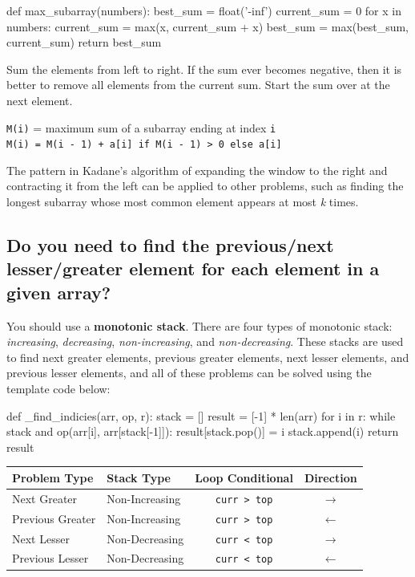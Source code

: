 \documentclass[12pt, titlepage]{article}
\begin{document}
\begin{python}
def max_subarray(numbers):
    best_sum = float('-inf')
    current_sum = 0
    for x in numbers:
        current_sum = max(x, current_sum + x)
        best_sum = max(best_sum, current_sum)
    return best_sum
\end{python}

Sum the elements from left to right. If the sum ever becomes negative,
then it is better to remove all elements from the current sum. Start the sum over at the next element.

\begin{center}
\texttt{M(i)} = maximum sum of a subarray ending at index \texttt{i} \\
\texttt{M(i) = M(i - 1) + a[i] if M(i - 1) > 0 else a[i]}
\end{center}

The pattern in Kadane's algorithm of expanding the window to the right and contracting it from the left can be applied to other problems, such as finding the longest subarray whose most common element appears at most \textit{k} times.

\subsection{Do you need to find the previous/next lesser/greater element for each element in a given array?}

You should use a \textbf{monotonic stack}. There are four types of monotonic stack: \textit{increasing}, \textit{decreasing}, \textit{non-increasing}, and \textit{non-decreasing}. These stacks are used to find next greater elements, previous greater elements, next lesser elements, and previous lesser elements, and all of these problems can be solved using the template code below: \medskip

\begin{python}
def _find_indicies(arr, op, r):
    stack = []
    result = [-1] * len(arr)
    for i in r:
        while stack and op(arr[i], arr[stack[-1]]):
            result[stack.pop()] = i
        stack.append(i)
    return result
\end{python} \medskip

\begin{center}
\begin{tabular}{|l|l|c|c|}
  \hline
  Problem Type & Stack Type & Loop Conditional & Direction \\
  \hline
  Next Greater & Non-Increasing & \texttt{curr > top} & $\rightarrow$ \\
  Previous Greater & Non-Increasing & \texttt{curr > top} & $\leftarrow$ \\
  Next Lesser & Non-Decreasing & \texttt{curr < top} & $\rightarrow$ \\
  Previous Lesser & Non-Decreasing & \texttt{curr < top} & $\leftarrow$ \\
  \hline
\end{tabular}
\end{center} \bigskip
\end{document}
